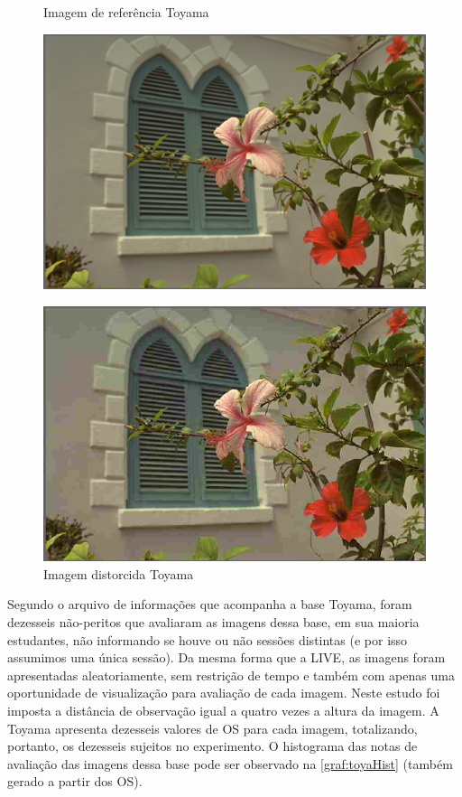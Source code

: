 \begin{figure}[htb]
 \label{fig:toyaex}
 \centering
  \begin{minipage}{0.48\textwidth}
    \centering
    \caption{Imagem de referência Toyama} \label{fig:toyaref}
    \includegraphics[width=\textwidth]{../img/toyaref07.pdf}
  \end{minipage}
  \hfill
  \begin{minipage}{0.48\textwidth}
    \centering
    \caption{Imagem distorcida Toyama} \label{fig:toyadist}
    \includegraphics[width=\textwidth]{../img/toyadist07_79.pdf}
  \end{minipage}
\end{figure}

Segundo o arquivo de informações que acompanha a base Toyama, foram dezesseis não-peritos que avaliaram as imagens dessa base, em sua maioria estudantes, não informando se houve ou não sessões distintas (e por isso assumimos uma única sessão). Da mesma forma que a LIVE, as imagens foram apresentadas aleatoriamente, sem restrição de tempo e também com apenas uma oportunidade de visualização para avaliação de cada imagem. Neste estudo foi imposta a distância de observação igual a quatro vezes a altura da imagem. A Toyama apresenta dezesseis valores de OS para cada imagem, totalizando, portanto, os dezesseis sujeitos no experimento. O histograma das notas de avaliação das imagens dessa base pode ser observado na \autoref{graf:toyaHist} (também gerado a partir dos OS).
 

